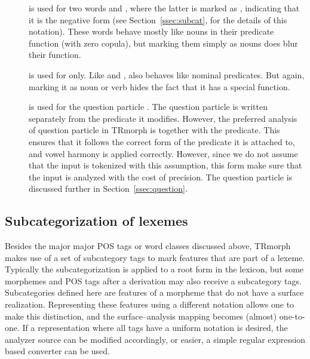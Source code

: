 \documentclass[twocolumn]{article}
\begin{document}
\begin{description}
\item[] is used for two words
 and  ,
where the latter is marked as , indicating that it is the
negative form (see Section~\ref{ssec:subcat}, for the details of this notation).
These words behave mostly like nouns in their predicate function (with
zero copula), but marking them simply as nouns does blur their
function.  
\item[] is used for  only. Like 
and ,  also behaves like nominal predicates. But
again, marking it as noun or verb hides the fact that it has a special
function.


\item[] is used for the question particle . The
question particle is written separately from the predicate it
modifies. However, the preferred analysis of question particle in
TRmorph is together with the predicate. This ensures that it follows
the correct form of the predicate it is attached to, and vowel harmony
is applied correctly. However, since we do not assume that the input
is tokenized with this assumption, this form make sure that the input
is analyzed with the cost of precision. The question particle is
discussed further in Section~\ref{ssec:question}.

\end{description}

\subsection{\label{ssec:subcat}Subcategorization of lexemes}

Besides the major major POS tags or word classes discussed above,
TRmorph makes use of a set of subcategory tags to mark features that
are part of a lexeme. Typically the
subcategorization is applied to a root form in the lexicon, but some
morphemes and POS tags after a derivation may also receive a
subcategory tags. Subcategories defined here are features of a morpheme
that do not have a surface realization. Representing these features using a
different notation allows one to make this distinction, and the
surface--analysis mapping becomes (almost) one-to-one.  If a 
representation where all tags have a uniform notation is desired, 
the analyzer source can be modified accordingly, or easier, a simple
regular expression based converter can be used.
\end{document}
